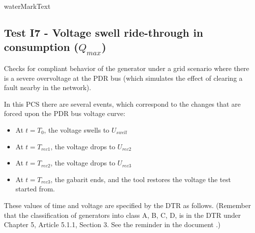     {{ waterMarkText }}

    \renewcommand{\DTRPcs}{GridVoltageSwell} %
    \renewcommand{\PCSname}{PCS_RTE-I16z3}
    \renewcommand{\OCname}{QMaxConsumption}


    \subsection{Test I7 - Voltage swell ride-through in consumption ($Q_{max}$)}

    Checks for compliant behavior of the generator under a grid scenario where
    there is a severe overvoltage at the PDR bus (which simulates the
    effect of clearing a fault nearby in the network).

    \GridCircuitZthree

    In this PCS there are several events, which correspond to the changes that are
    forced upon the PDR bus voltage curve:
    \begin{itemize}
        \item At $t = T_{0}$, the voltage swells to $U_{swell}$
        \item At $t = T_{rec1}$, the voltage drops to $U_{rec2}$
        \item At $t = T_{rec2}$, the voltage drops to $U_{rec3}$
        \item At $t = T_{rec3}$, the gabarit ends, and the tool restores the
        voltage the test started from.
    \end{itemize}
    These values of time and voltage are specified by the DTR as follows. (Remember
    that the classification of generators into class A, B, C, D, is in the DTR under
    Chapter 5, Article 5.1.1, Section 3. See the reminder in the document
    .)

